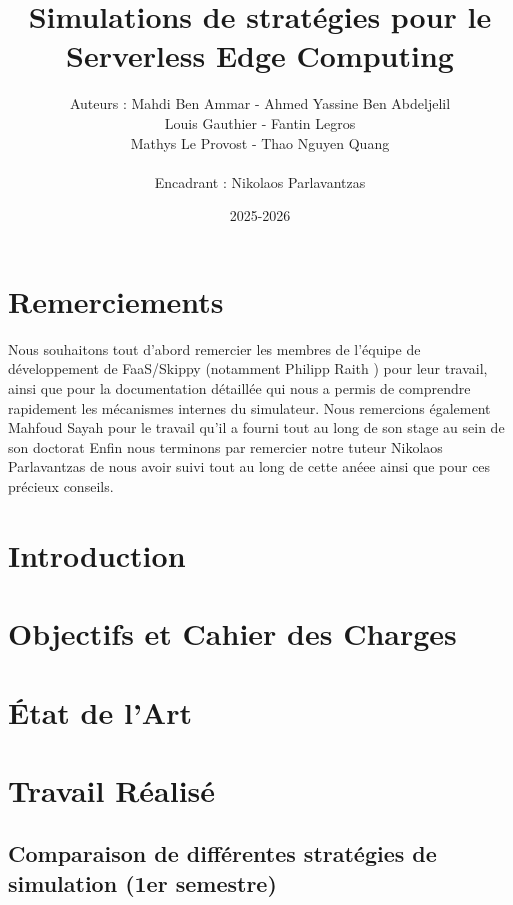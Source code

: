 \documentclass[a4paper,11pt]{article}
\title{\textbf{Simulations de stratégies pour le Serverless Edge Computing}}
\author{Auteurs :
	Mahdi Ben Ammar - Ahmed Yassine Ben Abdeljelil \\
	Louis Gauthier - Fantin Legros \\
	Mathys Le Provost - Thao Nguyen Quang \\ \\
	Encadrant : Nikolaos Parlavantzas}
\date{2025-2026}                    %
\begin{document}
\maketitle %

\tableofcontents %
\section*{Remerciements}
Nous souhaitons tout d'abord remercier les membres de l'équipe de développement de FaaS/Skippy (notamment Philipp Raith \cite{philipp_raith}) pour leur travail, ainsi que pour la documentation détaillée qui nous a permis de comprendre rapidement les mécanismes internes du simulateur.
Nous remercions également Mahfoud Sayah pour le travail qu'il a fourni tout au long de son stage au sein de son doctorat
Enfin nous terminons par remercier notre tuteur Nikolaos Parlavantzas de nous avoir suivi tout au long de cette anéee ainsi que pour ces précieux conseils.

\begin{abstract}

\end{abstract}
\section{Introduction}

\section{Objectifs et Cahier des Charges}

\section{État de l'Art}

\section{Travail Réalisé}
\subsection{Comparaison de différentes stratégies de simulation (1er semestre)}

\end{document}
